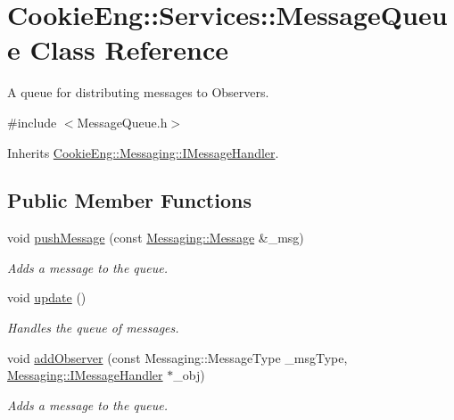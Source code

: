 \hypertarget{class_cookie_eng_1_1_services_1_1_message_queue}{}\section{Cookie\+Eng\+:\+:Services\+:\+:Message\+Queue Class Reference}
\label{class_cookie_eng_1_1_services_1_1_message_queue}


A queue for distributing messages to Observers.  




{\ttfamily \#include $<$Message\+Queue.\+h$>$}



Inherits \hyperlink{class_cookie_eng_1_1_messaging_1_1_i_message_handler}{Cookie\+Eng\+::\+Messaging\+::\+I\+Message\+Handler}.

\subsection*{Public Member Functions}
\begin{DoxyCompactItemize}
\item 
void \hyperlink{class_cookie_eng_1_1_services_1_1_message_queue_aa8e385cf13d310d88f97053897e4970e}{push\+Message} (const \hyperlink{class_cookie_eng_1_1_messaging_1_1_message}{Messaging\+::\+Message} \&\+\_\+msg)
\begin{DoxyCompactList}\small\item\em Adds a message to the queue. \end{DoxyCompactList}\item 
void \hyperlink{class_cookie_eng_1_1_services_1_1_message_queue_ab21464c42066c511f5e9284a24113ad9}{update} ()
\begin{DoxyCompactList}\small\item\em Handles the queue of messages. \end{DoxyCompactList}\item 
void \hyperlink{class_cookie_eng_1_1_services_1_1_message_queue_a33acc39b1189fd0ced268ee68e3eba7a}{add\+Observer} (const Messaging\+::\+Message\+Type \+\_\+msg\+Type, \hyperlink{class_cookie_eng_1_1_messaging_1_1_i_message_handler}{Messaging\+::\+I\+Message\+Handler} $\ast$\+\_\+obj)
\begin{DoxyCompactList}\small\item\em Adds a message to the queue. \end{DoxyCompactList}\end{DoxyCompactItemize}
